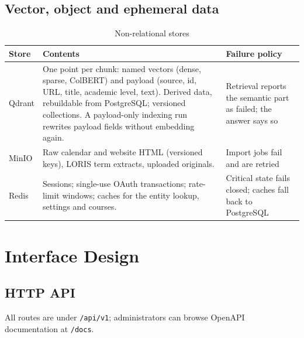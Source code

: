 \documentclass[11pt,letterpaper]{report}
\begin{document}
\section{Vector, object and ephemeral data}
\begin{table}[H]
\centering
\caption{Non-relational stores}\label{tab:stores}
\begin{tabularx}{\textwidth}{@{}P{2.2cm}LP{4.2cm}@{}}
\toprule
\textbf{Store} & \textbf{Contents} & \textbf{Failure policy} \\
\midrule
Qdrant & One point per chunk: named vectors (dense, sparse, ColBERT) and payload (source, id, URL, title, academic level, text). Derived data, rebuildable from PostgreSQL; versioned collections. A payload-only indexing run rewrites payload fields without embedding again. & Retrieval reports the semantic part as failed; the answer says so \\
MinIO & Raw calendar and website HTML (versioned keys), LORIS term extracts, uploaded originals. & Import jobs fail and are retried \\
Redis & Sessions; single-use OAuth transactions; rate-limit windows; caches for the entity lookup, settings and courses. & Critical state fails closed; caches fall back to PostgreSQL \\
\bottomrule
\end{tabularx}
\end{table}

\chapter{Interface Design}\label{ch:interfaces}

\section{HTTP API}
All routes are under \texttt{/api/v1}; administrators can browse OpenAPI documentation at \texttt{/docs}.
\end{document}
